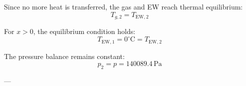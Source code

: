 Since no more heat is transferred, the gas and EW reach thermal equilibrium:  
\[
T_{g,2} = T_{\text{EW},2}
\]  

For \( x > 0 \), the equilibrium condition holds:  
\[
T_{\text{EW},1} = 0^\circ\text{C} = T_{\text{EW},2}
\]  

The pressure balance remains constant:  
\[
p_2 = p = 140089.4 \, \text{Pa}
\]  

---